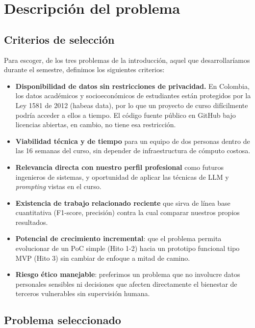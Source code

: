 \section{Descripción del problema}
\label{sec:descripcion-problema}

\subsection{Criterios de selección}

Para escoger, de los tres problemas de la introducción, aquel que desarrollaríamos durante el semestre, definimos los siguientes criterios:

\begin{itemize}
    \item \textbf{Disponibilidad de datos sin restricciones de privacidad.} En Colombia, los datos académicos y socioeconómicos de estudiantes están protegidos por la Ley 1581 de 2012 (habeas data), por lo que un proyecto de curso difícilmente podría acceder a ellos a tiempo. El código fuente público en GitHub bajo licencias abiertas, en cambio, no tiene esa restricción.
    \item \textbf{Viabilidad técnica y de tiempo} para un equipo de dos personas dentro de las 16 semanas del curso, sin depender de infraestructura de cómputo costosa.
    \item \textbf{Relevancia directa con nuestro perfil profesional} como futuros ingenieros de sistemas, y oportunidad de aplicar las técnicas de LLM y \textit{prompting} vistas en el curso.
    \item \textbf{Existencia de trabajo relacionado reciente} que sirva de línea base cuantitativa (F1-score, precisión) contra la cual comparar nuestros propios resultados.
    \item \textbf{Potencial de crecimiento incremental}: que el problema permita evolucionar de un PoC simple (Hito 1-2) hacia un prototipo funcional tipo MVP (Hito 3) sin cambiar de enfoque a mitad de camino.
    \item \textbf{Riesgo ético manejable}: preferimos un problema que no involucre datos personales sensibles ni decisiones que afecten directamente el bienestar de terceros vulnerables sin supervisión humana.
\end{itemize}

\subsection{Problema seleccionado}

